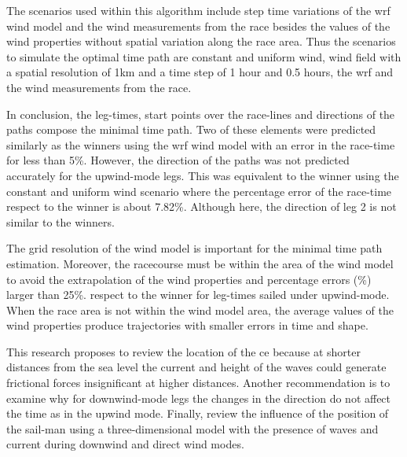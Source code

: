 The scenarios used within this algorithm include step time variations of the \acrshort{wrf} wind model and the wind measurements from the race besides the  values of the wind properties without spatial variation along the race area. Thus the scenarios to simulate the optimal time path are constant and uniform wind, wind field with a spatial resolution of 1km and a time step of 1 hour and 0.5 hours, the \acrshort{wrf} and the wind measurements from the race. \par 
In conclusion, the leg-times, start points over the race-lines and directions of the paths compose the minimal time path. Two of these elements were predicted similarly as the winners using the \acrshort{wrf} wind model with an error in the race-time for less than 5\%. However, the direction of the paths was not predicted accurately for the upwind-mode legs. This was equivalent to the winner using the constant and uniform wind scenario where the percentage error of the race-time respect to the winner is about 7.82\%. Although here, the direction of leg 2 is not similar to the winners. \par \noindent
The grid resolution of the wind model is important for the minimal time path estimation. Moreover, the racecourse must be within the area of the wind model to avoid the extrapolation of the wind properties %
and percentage errors (\%) larger than 25\%. respect to the winner for leg-times sailed under upwind-mode. When the race area is not within the wind model area, the average values of the wind properties produce trajectories with smaller errors in time and shape. \par 
This research proposes to review the location of the \acrshort{ce} because at shorter distances from the sea level the current and height of the waves could generate frictional forces insignificant at higher distances. Another recommendation is to examine why for downwind-mode legs the changes in the direction do not affect the time as in the upwind mode. Finally, review the influence of the position of the sail-man using a three-dimensional model with the presence of waves and current during downwind and direct wind modes. \par 
 